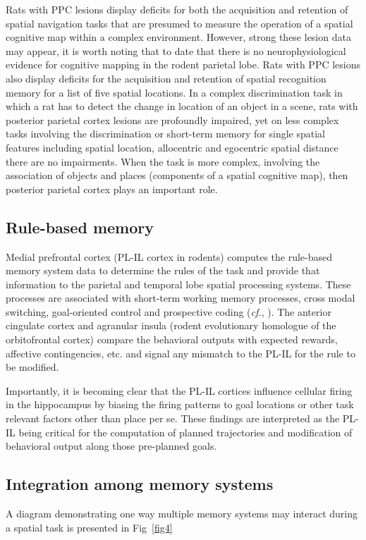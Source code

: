 \documentclass[doc, longtable]{apa6}
\begin{document}
Rats with PPC lesions display deficits for both the acquisition and retention of spatial navigation tasks that are presumed to measure the operation of a spatial cognitive map within a complex environment. However, strong these lesion data may appear, it is worth noting that to date that there is no neurophysiological evidence for cognitive mapping in the rodent parietal lobe. Rats with PPC lesions also display deficits for the acquisition and retention of spatial recognition memory for a list of five spatial locations. In a complex discrimination task in which a rat has to detect the change in location of an object in a scene, rats with posterior parietal cortex lesions are profoundly impaired, yet on less complex tasks involving the discrimination or short-term memory for single spatial features including spatial location, allocentric and egocentric spatial distance there are no impairments. When the task is more complex, involving the association of objects and places (components of a spatial cognitive map), then posterior parietal cortex plays an important role.

\subsection{Rule-based memory}
Medial prefrontal cortex (PL-IL cortex in rodents) computes the rule-based memory system data to determine the rules of the task and provide that information to the parietal and temporal lobe spatial processing systems. These processes are associated with short-term working memory processes, cross modal switching, goal-oriented control and prospective coding (\textit{cf.}, \cite{young2009double, rich2009rat}). The anterior cingulate cortex and agranular insula (rodent evolutionary homologue of the orbitofrontal cortex) compare the behavioral outputs with expected rewards, affective contingencies, etc. and signal any mismatch to the PL-IL for the rule to be modified.
	
Importantly, it is becoming clear that the PL-IL cortices influence cellular firing in the hippocampus by biasing the firing patterns to goal locations or other task relevant factors other than place per se. These findings are interpreted as the PL-IL being critical for the computation of planned trajectories and modification of behavioral output along those pre-planned goals.

\subsection{Integration among memory systems}
A diagram demonstrating one way multiple memory systems may interact during a spatial task is presented in Fig~\ref{fig4}
\end{document}
